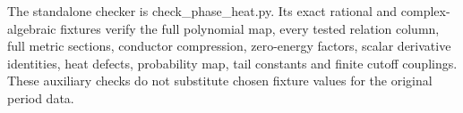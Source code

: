 \documentclass[10pt]{article}
\begin{document}
The standalone checker is check\_phase\_heat.py. Its exact rational and complex-algebraic fixtures verify the full polynomial map, every tested relation column, full metric sections, conductor compression, zero-energy factors, scalar derivative identities, heat defects, probability map, tail constants and finite cutoff couplings. These auxiliary checks do not substitute chosen fixture values for the original period data.
\end{document}
